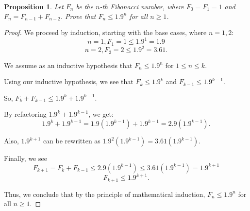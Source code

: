 \documentclass{article}
\newtheorem{proposition}{Proposition}
\theoremstyle{definition}
\begin{document}
\begin{proposition}
    Let \(F_n\) be the \(n\)-th Fibonacci number, where \(F_0 = F_1 = 1\)
    and \(F_n = F_{n-1} + F_{n-2}\). Prove that \(F_n \le 1.9^n\) for all
    \(n \ge 1\).
\end{proposition}
\begin{proof}
    We proceed by induction, starting with the base cases, where \(n=1,2\):
    \[n = 1, F_1 = 1 \le 1.9^1 = 1.9\]
    \[n = 2, F_2 = 2 \le 1.9^2 = 3.61.\]

    We assume as an inductive hypothesis that \(F_n \le 1.9^n\) for \(1 \le n \le k\).

    Using our inductive hypothesis, we see that \(F_k \le 1.9^k\)
    and \(F_{k-1} \le 1.9^{k-1}\).

    So, \(F_k + F_{k-1} \le 1.9^k + 1.9^{k-1}\).

    By refactoring \(1.9^k + 1.9^{k-1}\), we get:
    \[1.9^k + 1.9^{k-1} = 1.9(1.9^{k-1}) + 1.9^{k-1} = 2.9(1.9^{k-1}).\]

    Also, \(1.9^{k+1}\) can be rewritten as \(1.9^2 (1.9^{k-1}) = 3.61(1.9^{k-1})\).

    Finally, we see
    \[F_{k+1} = F_k + F_{k-1} \le 2.9(1.9^{k-1}) \le 3.61(1.9^{k-1}) = 1.9^{k+1}\]
    \[F_{k+1} \le 1.9^{k+1}.\]

    Thus, we conclude that by the principle of mathematical induction, 
    \(F_n \le 1.9^n\) for all \(n \ge 1\).
\end{proof}
\end{document}
